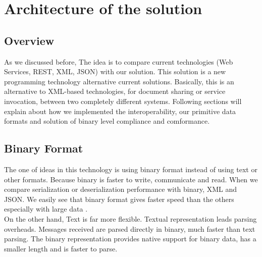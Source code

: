 
\chapter{Architecture of the solution}
\label{chapter:architecture}


\section{Overview}
\label{section:overview}

As we discussed before, The idea is to compare current technologies (Web Services, REST, XML, JSON) with our solution.
This solution is a new programming technology alternative current solutions. Basically, this is an alternative to
XML-based technologies, for document sharing or service invocation, between two completely different systems.
Following sections will explain about how we implemented the interoperability, our primitive data formats and solution
of binary level compliance and comformance.

\section{Binary Format}
\label{section:binary}

The one of ideas in this technology is using binary format instead of using text or other formats. Because binary is faster to
write, communicate and read. When we compare serialization or deserialization performance with binary, XML and JSON.
We easily see that binary format gives faster speed than the others especially with large data
\citep{binary:2016:Online}.\\

On the other hand, Text is far more flexible. Textual representation leads parsing overheads. Messages received are
parsed directly in binary, much faster than text parsing. The binary representation provides native support for
binary data, has a smaller length and is faster to parse.\\

